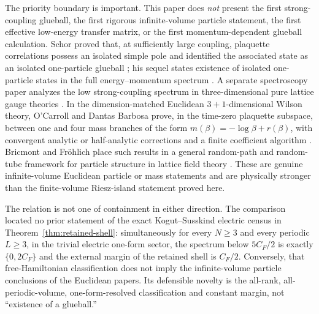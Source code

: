 \documentclass[11pt]{article}
\theoremstyle{plain}
\theoremstyle{definition}
\theoremstyle{remark}
\newcommand{\CF}{C_F}
\begin{document}
The priority boundary is important.  This paper does \emph{not} present the
first strong-coupling glueball, the first rigorous infinite-volume particle
statement, the first effective low-energy transfer matrix, or the first
momentum-dependent glueball calculation.  Schor proved that, at sufficiently
large coupling, plaquette correlations possess an isolated simple pole and
identified the associated state as an isolated one-particle glueball
\cite{Schor1983Existence}; his sequel states existence of isolated
one-particle states in the full energy--momentum spectrum
\cite{Schor1984EnergyMomentum}.  A separate spectroscopy paper analyzes the
low strong-coupling spectrum in three-dimensional pure lattice gauge theories
\cite{Schor1984Spectroscopy}.  In the dimension-matched Euclidean
$3{+}1$-dimensional Wilson theory, O'Carroll and Dantas Barbosa prove, in the
time-zero plaquette subspace, between one and four mass branches of the form
$m(\beta)=-\log\beta+r(\beta)$, with convergent analytic or half-analytic
corrections and a finite coefficient algorithm \cite{OCarrollBarbosa1985}.
Bricmont and Fr\"ohlich place such results in a general random-path and
random-tube framework for particle structure in lattice field theory
\cite{BricmontFrohlich1985General}.  These are genuine infinite-volume
Euclidean particle or mass statements and are physically stronger than the
finite-volume Riesz-island statement proved here.

The relation is not one of containment in either direction.  The comparison
located no prior statement of the exact Kogut--Susskind electric census in
Theorem~\ref{thm:retained-shell}: simultaneously for every $N\ge3$ and every
periodic $L\ge3$, in the trivial electric one-form sector, the spectrum below
$5\CF/2$ is exactly $\{0,2\CF\}$ and the external margin of the retained shell
is $\CF/2$.  Conversely, that free-Hamiltonian classification does not imply
the infinite-volume particle conclusions of the Euclidean papers.  Its
defensible novelty is the all-rank, all-periodic-volume, one-form-resolved
classification and constant margin, not ``existence of a glueball.''
\end{document}
